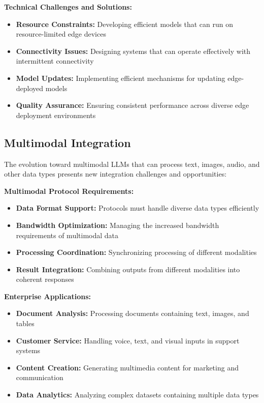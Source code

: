 \textbf{Technical Challenges and Solutions:}
\begin{itemize}
    \item \textbf{Resource Constraints:} Developing efficient models that can run on resource-limited edge devices
    \item \textbf{Connectivity Issues:} Designing systems that can operate effectively with intermittent connectivity
    \item \textbf{Model Updates:} Implementing efficient mechanisms for updating edge-deployed models
    \item \textbf{Quality Assurance:} Ensuring consistent performance across diverse edge deployment environments
\end{itemize}

\subsection{Multimodal Integration}

The evolution toward multimodal LLMs that can process text, images, audio, and other data types presents new integration challenges and opportunities:

\textbf{Multimodal Protocol Requirements:}
\begin{itemize}
    \item \textbf{Data Format Support:} Protocols must handle diverse data types efficiently
    \item \textbf{Bandwidth Optimization:} Managing the increased bandwidth requirements of multimodal data
    \item \textbf{Processing Coordination:} Synchronizing processing of different modalities
    \item \textbf{Result Integration:} Combining outputs from different modalities into coherent responses
\end{itemize}

\textbf{Enterprise Applications:}
\begin{itemize}
    \item \textbf{Document Analysis:} Processing documents containing text, images, and tables
    \item \textbf{Customer Service:} Handling voice, text, and visual inputs in support systems
    \item \textbf{Content Creation:} Generating multimedia content for marketing and communication
    \item \textbf{Data Analytics:} Analyzing complex datasets containing multiple data types
\end{itemize}

